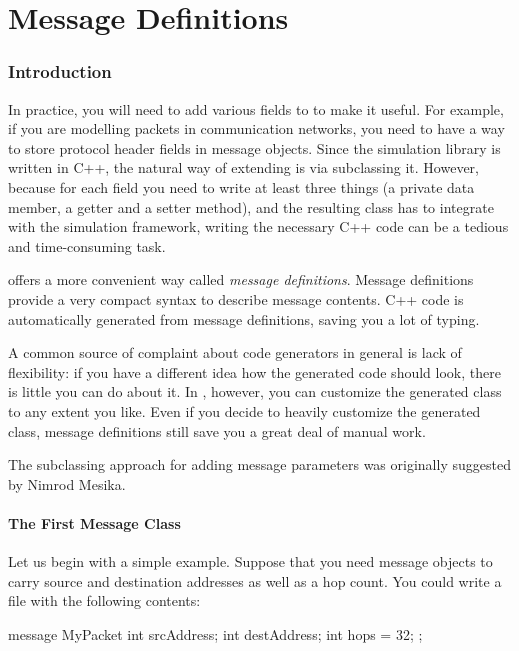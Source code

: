 \chapter{Message Definitions}
\label{cha:message-definitions}

\subsection{Introduction}

In practice, you will need to add various fields to  to
make it useful. For example, if you are modelling packets in communication
networks, you need to have a way to store protocol header fields in message
objects. Since the simulation library is written in C++, the natural way
of extending  is via subclassing it.
However, because for each field you need to write at least
three things (a private data member, a getter and a setter method),
and the resulting class has to integrate with the simulation framework,
writing the necessary C++ code can be a tedious and time-consuming task.

{\opp} offers a more convenient way called \textit{message definitions}.
Message definitions provide a very compact syntax to describe
message contents. C++ code is automatically generated from message
definitions, saving you a lot of typing.

A common source of complaint about code generators in general is
lack of flexibility: if you have a different idea how the generated
code should look, there is little you can do about it.
In {\opp}, however, you can
customize the generated class to any extent you like.
Even if you decide to heavily customize the generated class,
message definitions still save you a great deal of manual work.

The subclassing approach for adding message parameters was originally
suggested by Nimrod Mesika.


\subsubsection{The First Message Class}

Let us begin with a simple example. Suppose that you need message objects to
carry source and destination addresses as well as a hop count. You could write
a  file with the following contents:


\begin{msg}
message MyPacket
{
     int srcAddress;
     int destAddress;
     int hops = 32;
};
\end{msg}

